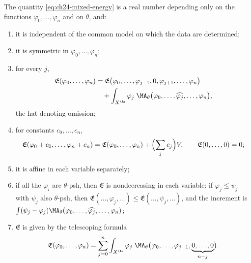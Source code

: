 \begin{proposition}
\label{prop:ch24-energy-basic}
The quantity \eqref{eq:ch24-mixed-energy} is a real number depending only on
the functions $\varphi_0,\ldots,\varphi_n$ and on $\theta$, and:
\begin{enumerate}
\item\label{itm:ch24-eb:model} it is independent of the common model on
 which the data are determined;
\item\label{itm:ch24-eb:sym} it is symmetric in $\varphi_0,\ldots,\varphi_n$;
\item\label{itm:ch24-eb:slot} for every $j$,
 \begin{equation}
 \label{eq:ch24-energy-slot}
  \begin{aligned}
  \mathfrak E(\varphi_0,\ldots,\varphi_n)
  &=\mathfrak E\bigl(\varphi_0,\ldots,\varphi_{j-1},0,
      \varphi_{j+1},\ldots,\varphi_n\bigr)\\
  &\quad+\int_{X^{\An}}\varphi_j\;
     \MA_\theta\bigl(\varphi_0,\ldots,\widehat{\varphi_j},
       \ldots,\varphi_n\bigr),
  \end{aligned}
 \end{equation}
 the hat denoting omission;
\item\label{itm:ch24-eb:const} for constants $c_0,\ldots,c_n$,
 \begin{equation}
 \label{eq:ch24-energy-constants}
  \mathfrak E(\varphi_0+c_0,\ldots,\varphi_n+c_n)
  =\mathfrak E(\varphi_0,\ldots,\varphi_n)+\Bigl(\sum_jc_j\Bigr)V,
  \qquad \mathfrak E(0,\ldots,0)=0;
 \end{equation}
\item\label{itm:ch24-eb:affine} it is affine in each variable separately;
\item\label{itm:ch24-eb:mono} if all the $\varphi_i$ are $\theta$-psh,
 then $\mathfrak E$ is nondecreasing in each variable: if
 $\varphi_j\leq\psi_j$ with $\psi_j$ also $\theta$-psh, then
 $\mathfrak E(\ldots,\varphi_j,\ldots)\leq\mathfrak E(\ldots,\psi_j,\ldots)$,
 and the increment is
 $\int(\psi_j-\varphi_j)\MA_\theta(\varphi_0,\ldots,\widehat{\varphi_j},
 \ldots,\varphi_n)$;
\item\label{itm:ch24-eb:telescope} $\mathfrak E$ is given by the
 telescoping formula
 \begin{equation}
 \label{eq:ch24-energy-telescoping}
  \mathfrak E(\varphi_0,\ldots,\varphi_n)
  =\sum_{j=0}^{n}\int_{X^{\An}}\varphi_j\;
    \MA_\theta\bigl(\varphi_0,\ldots,\varphi_{j-1},
      \underbrace{0,\ldots,0}_{n-j}\bigr).
 \end{equation}
\end{enumerate}
\end{proposition}

